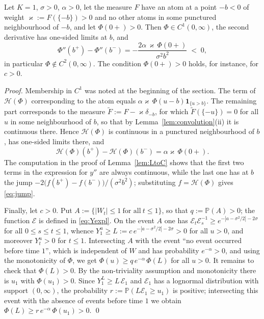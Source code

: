 \documentclass[smallextended]{svjour3}
\newcommand{\bbp}{\mathbb{P}}
\newcommand{\Ind}{\mathbf{1}}
\begin{document}
\begin{proposition}
\label{prop:counterexample}
Let $K=1$, $\sigma>0$, $\alpha>0$, let the measure $F$ have an atom at a point
$-b<0$ of weight $\varkappa:=F(\{-b\})>0$ and no other atoms in some punctured
neighbourhood of $-b$, and let $\Phi(0+)>0$. Then $\Phi\in C^1(0,\infty)$, the
second derivative has one-sided limits at $b$, and
\begin{equation}
    \label{eq:jump}
    \Phi''(b^+)-\Phi''(b^-)=-\frac{2\alpha\,\varkappa\,\Phi(0+)}{\sigma^2b^2}
    \;<\;0 ,
\end{equation}
in particular $\Phi\notin C^2(0,\infty)$. The condition $\Phi(0+)>0$ holds,
for instance, for $c>0$.
\end{proposition}

\begin{proof}
Membership in $C^1$ was noted at the beginning of the section. The term of
$\mathcal H(\Phi)$ corresponding to the atom equals
$\alpha\varkappa\,\Phi(u-b)\Ind_{\{u>b\}}$. The remaining part corresponds to
the measure $\widetilde F:=F-\varkappa\delta_{-b}$, for which
$\widetilde F(\{-u\})=0$ for all $u$ in some neighbourhood of $b$, so that by
Lemma~\ref{lem:convolution}{\rm(ii)} it is continuous there. Hence
$\mathcal H(\Phi)$ is continuous in a punctured neighbourhood of $b$, has
one-sided limits there, and
$$
\mathcal H(\Phi)(b^+)-\mathcal H(\Phi)(b^-)=\alpha\varkappa\,\Phi(0+) .
$$
The computation in the proof of Lemma~\ref{lem:LtoC} shows that the first two
terms in the expression for $y''$ are always continuous, while the last one has
at $b$ the jump $-2\bigl(f(b^+)-f(b^-)\bigr)/(\sigma^2b^2)$; substituting
$f=\mathcal H(\Phi)$ gives \eqref{eq:jump}.

Finally, let $c>0$. Put $A:=\{|W_t|\le1\ \text{for all}\ t\le1\}$, so that
$q:=\bbp(A)>0$; the function $\mathcal E$ is defined in \eqref{eq:Yexpl}. On
the event $A$ one has
$\mathcal E_t\mathcal E_s^{-1}\ge e^{-|a-\sigma^2/2|-2\sigma}$ for all
$0\le s\le t\le1$, whence
$Y^u_1\ge L:=c\,e^{-|a-\sigma^2/2|-2\sigma}>0$ for all $u>0$, and moreover
$Y^u_t>0$ for $t\le1$. Intersecting $A$ with the event ``no event occurred
before time $1$'', which is independent of $W$ and has probability
$e^{-\alpha}>0$, and using the monotonicity of $\Phi$, we get
$\Phi(u)\ge q\,e^{-\alpha}\,\Phi(L)$ for all $u>0$. It remains to check that
$\Phi(L)>0$. By the non-triviality assumption and monotonicity there is $u_1$
with $\Phi(u_1)>0$. Since $Y^{L}_1\ge L\,\mathcal E_1$ and $\mathcal E_1$ has a
lognormal distribution with support $(0,\infty)$, the probability
$r:=\bbp(L\mathcal E_1\ge u_1)$ is positive; intersecting this event with the
absence of events before time $1$ we obtain
$\Phi(L)\ge r\,e^{-\alpha}\,\Phi(u_1)>0$.
\qed
\end{proof}
\end{document}
